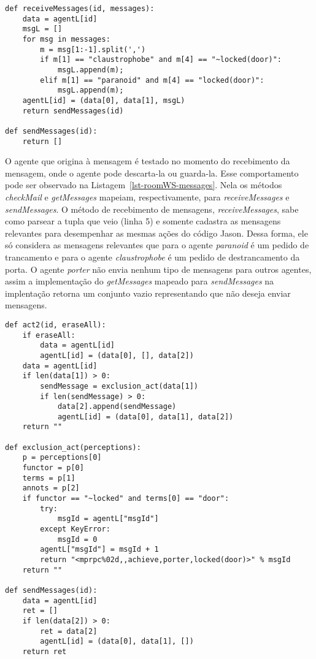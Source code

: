 \lstset{linewidth=130mm}
\begin{center}
    \begin{minipage}{140mm}
	\begin{lstlisting}[frame=trbl, caption=Métodos relacionados com a comunicação do agente \emph{porter}., label=lst-roomWS-messages]
def receiveMessages(id, messages):
	data = agentL[id]
	msgL = []
	for msg in messages:
		m = msg[1:-1].split(',')
		if m[1] == "claustrophobe" and m[4] == "~locked(door)":
			msgL.append(m);
		elif m[1] == "paranoid" and m[4] == "locked(door)":
			msgL.append(m);
	agentL[id] = (data[0], data[1], msgL)
	return sendMessages(id)

def sendMessages(id):
	return []
	\end{lstlisting}
    \end{minipage}
\end{center}

O agente que origina à mensagem é testado no momento do recebimento
da mensagem, onde o agente pode descarta-la ou guarda-la.
Esse comportamento pode ser observado na Listagem~\ref{lst-roomWS-messages}.
Nela os métodos \emph{checkMail} e \emph{getMessages} mapeiam,
respectivamente, para \emph{receiveMessages} e \emph{sendMessages}. O método
de recebimento de mensagens, \emph{receiveMessages}, sabe como parsear a tupla
que veio (linha 5) e somente cadastra as mensagens relevantes para desempenhar
as mesmas ações do código Jason. Dessa forma, ele só considera as mensagens
relevantes que para o agente \emph{paranoid} é um pedido de trancamento
e para o agente \emph{claustrophobe} é um pedido de destrancamento da porta.
O agente \emph{porter} não envia nenhum tipo de mensagens para
outros agentes, assim a implementação do \emph{getMessages} mapeado para
\emph{sendMessages} na implentação retorna um conjunto vazio representando que
não deseja enviar mensagens.

\lstset{linewidth=130mm}
\begin{center}
    \begin{minipage}{140mm}
	\begin{lstlisting}[frame=trbl, caption=Métodos do agente \emph{paranoid}., label=lst-roomWS-paranoid]
def act2(id, eraseAll):
	if eraseAll:
		data = agentL[id]
		agentL[id] = (data[0], [], data[2])
	data = agentL[id]
	if len(data[1]) > 0:
		sendMessage = exclusion_act(data[1])
		if len(sendMessage) > 0:
			data[2].append(sendMessage)
			agentL[id] = (data[0], data[1], data[2])
	return ""

def exclusion_act(perceptions):
	p = perceptions[0]
	functor = p[0]
	terms = p[1]
	annots = p[2]
	if functor == "~locked" and terms[0] == "door":
		try:
			msgId = agentL["msgId"]
		except KeyError:
			msgId = 0
		agentL["msgId"] = msgId + 1
		return "<mprpc%02d,,achieve,porter,locked(door)>" % msgId
	return ""

def sendMessages(id):
	data = agentL[id]
	ret = []
	if len(data[2]) > 0:
		ret = data[2]
		agentL[id] = (data[0], data[1], [])
	return ret
	\end{lstlisting}
    \end{minipage}
\end{center}

